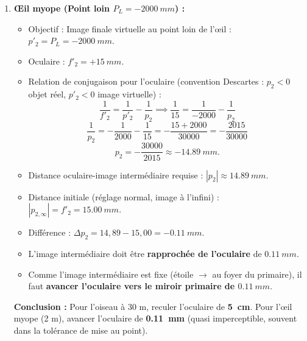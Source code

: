 \documentclass[11pt]{article}
\begin{document}
\begin{exoresolu}
\begin{enumerate}
\begin{itemize}
    \end{itemize}
    \item \textbf{Œil myope (Point loin $P_L = -\SI{2000}{mm}$) :}
    \begin{itemize}
        \item Objectif : Image finale virtuelle au point loin de l'œil : $p'_2 = P_L = -\SI{2000}{mm}$.
        \item Oculaire : $f'_2 = +\SI{15}{mm}$.
        \item Relation de conjugaison pour l'oculaire (convention Descartes : $p_2<0$ objet réel, $p'_2<0$ image virtuelle) :
        \[
        \frac{1}{f'_2} = \frac{1}{p'_2} - \frac{1}{p_2} \implies \frac{1}{15} = \frac{1}{-2000} - \frac{1}{p_2}
        \]
        \[
        \frac{1}{p_2} = -\frac{1}{2000} - \frac{1}{15} = -\frac{15 + 2000}{30000} = -\frac{2015}{30000}
        \]
        \[
        p_2 = -\frac{30000}{2015} \approx -\SI{14,89}{mm}.
        \]
        \item Distance oculaire-image intermédiaire requise : $|p_2| \approx \SI{14,89}{mm}$.
        \item Distance initiale (réglage normal, image à l'infini) : $|p_{2,\infty}| = f'_2 = \SI{15,00}{mm}$.
        \item Différence : $\Delta p_2 = 14,89 - 15,00 = -\SI{0,11}{mm}$.
        \item L'image intermédiaire doit être \textbf{rapprochée de l'oculaire} de $\SI{0,11}{mm}$.
        \item Comme l'image intermédiaire est fixe (étoile $\rightarrow$ au foyer du primaire), il faut \textbf{avancer l'oculaire vers le miroir primaire de $\SI{0,11}{mm}$}.
    \end{itemize}
    \textbf{Conclusion :} Pour l'oiseau à 30 m, reculer l'oculaire de \textbf{\SI{5}{cm}}. Pour l'œil myope (2 m), avancer l'oculaire de \textbf{\SI{0,11}{mm}} (quasi imperceptible, souvent dans la tolérance de mise au point).
\end{enumerate}
\end{exoresolu}
\end{document}
